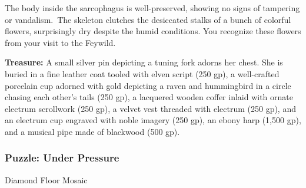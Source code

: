 \documentclass[10pt,twocolumn]{article}
\let\oldtextbf\textbf
\renewcommand{\textbf}[1]{\oldtextbf{{#1}}}
\begin{document}
The body inside the sarcophagus is well-preserved, showing no signs of
tampering or vandalism.~The skeleton clutches the desiccated stalks of a
bunch of colorful flowers, surprisingly dry despite the humid
conditions. You recognize these flowers from your visit to the Feywild.

\textbf{Treasure:} A small silver pin depicting a tuning fork adorns her
chest. She is buried in a fine leather coat tooled with elven script
(250 gp), a well-crafted porcelain cup adorned with gold depicting a
raven and hummingbird in a circle chasing each other's tails (250 gp), a
lacquered wooden coffer inlaid with ornate electrum scrollwork (250 gp),
a velvet vest threaded with electrum (250 gp), and an electrum cup
engraved with noble imagery (250 gp), an ebony harp (1,500 gp), and a
musical pipe made of blackwood (500 gp).

\subsubsection{Puzzle: Under Pressure}\label{puzzle-under-pressure}

\begin{tcolorbox}[
  colback={imagecolor},
  coltext=black,
  colframe=black,
  boxrule=1pt,
  arc=6pt,
  left=4pt,
  right=4pt,
  top=2pt,
  bottom=2pt,
  boxsep=4pt,
  before skip=10pt,
  after skip=10pt,
  fontupper={\blockquoteFont\small\linespread{0.9}\selectfont\color{black}}
]

\faPhotoVideo\hspace{0.8em}\begin{minipage}[t]{\dimexpr\linewidth-1.8em\hangindent=1.8em\hangafter=0}Diamond
Floor Mosaic

\end{minipage}\end{tcolorbox}
\end{document}
